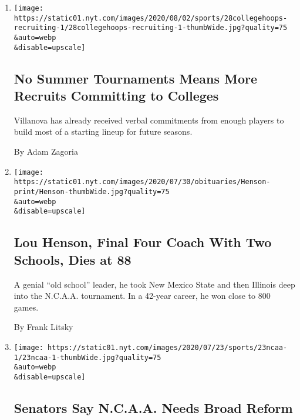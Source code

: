 \begin{enumerate}
\def\labelenumi{\arabic{enumi}.}
\item
  \href{/2020/07/30/sports/ncaabasketball/college-basketball-recruiting.html}{}

  \texttt{[image: https://static01.nyt.com/images/2020/08/02/sports/28collegehoops-recruiting-1/28collegehoops-recruiting-1-thumbWide.jpg?quality=75\\\&auto=webp\\\&disable=upscale]}

  \hypertarget{no-summer-tournaments-means-more-recruits-committing-to-colleges}{%
  \subsection{No Summer Tournaments Means More Recruits Committing to
  Colleges}\label{no-summer-tournaments-means-more-recruits-committing-to-colleges}}

  Villanova has already received verbal commitments from enough players
  to build most of a starting lineup for future seasons.

  By Adam Zagoria
\item
  \href{/2020/07/29/sports/ncaabasketball/lou-henson-dead.html}{}

  \texttt{[image: https://static01.nyt.com/images/2020/07/30/obituaries/Henson-print/Henson-thumbWide.jpg?quality=75\\\&auto=webp\\\&disable=upscale]}

  \hypertarget{lou-henson-final-four-coach-with-two-schools-dies-at-88}{%
  \subsection{Lou Henson, Final Four Coach With Two Schools, Dies at
  88}\label{lou-henson-final-four-coach-with-two-schools-dies-at-88}}

  A genial ``old school'' leader, he took New Mexico State and then
  Illinois deep into the N.C.A.A. tournament. In a 42-year career, he
  won close to 800 games.

  By Frank Litsky
\item
  \href{/2020/07/23/sports/ncaa-NIL-rights.html}{}

  \texttt{[image: https://static01.nyt.com/images/2020/07/23/sports/23ncaa-1/23ncaa-1-thumbWide.jpg?quality=75\\\&auto=webp\\\&disable=upscale]}

  \hypertarget{senators-say-ncaa-needs-broad-reform}{%
  \subsection{Senators Say N.C.A.A. Needs Broad
  Reform}\label{senators-say-ncaa-needs-broad-reform}}


\end{enumerate}
